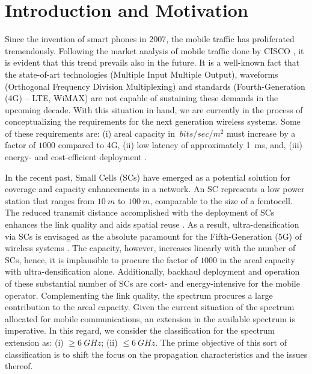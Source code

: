 \documentclass[draftcls, onecolumn, 11pt]{IEEEtran}
\begin{document}
\section{Introduction and Motivation}
Since the invention of smart phones in 2007, the mobile traffic has proliferated tremendously. Following the market analysis of mobile traffic done by CISCO \cite{CISCO14}, it is evident that this trend prevails also in the future. It is a well-known fact that the state-of-art technologies (Multiple Input Multiple Output), waveforms (Orthogonal Frequency Division Multiplexing) and standards (Fourth-Generation (4G) -- LTE, WiMAX) are not capable of sustaining these demands in the upcoming decade. With this situation in hand, we are currently in the process of conceptualizing the requirements for the next generation wireless systems. Some of these requirements are: (i) areal capacity in $\SI{}{bits/sec/m^2}$ must increase by a factor of $1000$ compared to 4G, (ii) low latency of approximately \SI{1}{ms}, and, (iii) energy- and cost-efficient deployment \cite{Andrews14}.

In the recent past, Small Cells (SCs) have emerged as a potential solution for coverage and capacity enhancements in a network. An SC represents a low power station that ranges from $\SI{10}{m}$ to $\SI{100}{m}$, comparable to the size of a femtocell. The reduced transmit distance accomplished with the deployment of SCs enhances the link quality and aids spatial reuse \cite{Chander08}. 
As a result, ultra-densification via SCs is envisaged as the absolute paramount for the Fifth-Generation (5G) of wireless systems \cite{Andrews14}. 
The capacity, however, increases linearly with the number of SCs, hence, it is implausible to procure the factor of $1000$ in the areal capacity with ultra-densification alone.  
Additionally, backhaul deployment and operation of these substantial number of SCs are cost- and energy-intensive for the mobile operator.  
Complementing the link quality, the spectrum procures a large contribution to the areal capacity. Given the current situation of the spectrum allocated for mobile communications, an extension in the available spectrum is imperative. In this regard, we consider the classification for the spectrum extension as: 
(i) $\ge \SI{6}{GHz}$; 
(ii) $\le \SI{6}{GHz}$. 
The prime objective of this sort of classification is to shift the focus on the propagation characteristics and the issues thereof.   
\end{document}
